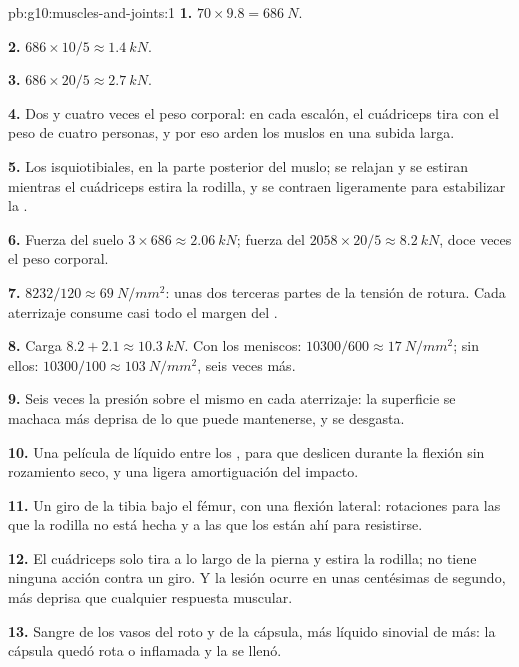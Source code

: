 \begin{solution}{pb:g10:muscles-and-joints:1}
\textbf{1.} $70 \times 9.8 = \qty{686}{N}$.

\textbf{2.} $686 \times 10/5 \approx \qty{1.4}{kN}$.

\textbf{3.} $686 \times 20/5 \approx \qty{2.7}{kN}$.

\textbf{4.} Dos y cuatro veces el peso corporal: en cada escalón, el
cuádriceps tira con el peso de cuatro personas, y por eso arden los
muslos en una subida larga.

\textbf{5.} Los isquiotibiales, en la parte posterior del muslo; se
relajan y se estiran mientras el cuádriceps estira la rodilla, y se
contraen ligeramente para estabilizar la .

\textbf{6.} Fuerza del suelo $3 \times 686 \approx \qty{2.06}{kN}$;
fuerza del  $2058 \times 20/5 \approx \qty{8.2}{kN}$, doce veces
el peso corporal.

\textbf{7.} $8232/120 \approx \qty{69}{N/mm^2}$: unas dos terceras
partes de la tensión de rotura. Cada aterrizaje consume casi todo el
margen del .

\textbf{8.} Carga $8.2 + 2.1 \approx \qty{10.3}{kN}$. Con los meniscos:
$10300/600 \approx \qty{17}{N/mm^2}$; sin ellos: $10300/100 \approx
\qty{103}{N/mm^2}$, seis veces más.

\textbf{9.} Seis veces la presión sobre el mismo  en cada
aterrizaje: la superficie se machaca más deprisa de lo que puede
mantenerse, y se desgasta.

\textbf{10.} Una película de líquido entre los , para que
deslicen durante la flexión sin rozamiento seco, y una ligera
amortiguación del impacto.

\textbf{11.} Un giro de la tibia bajo el fémur, con una flexión
lateral: rotaciones para las que la rodilla no está hecha y a las que
los  están ahí para resistirse.

\textbf{12.} El cuádriceps solo tira a lo largo de la pierna y estira
la rodilla; no tiene ninguna acción contra un giro. Y la lesión ocurre
en unas centésimas de segundo, más deprisa que cualquier respuesta
muscular.

\textbf{13.} Sangre de los vasos del  roto y de la cápsula,
más líquido sinovial de más: la cápsula quedó rota o inflamada y la
 se llenó.


\end{solution}

